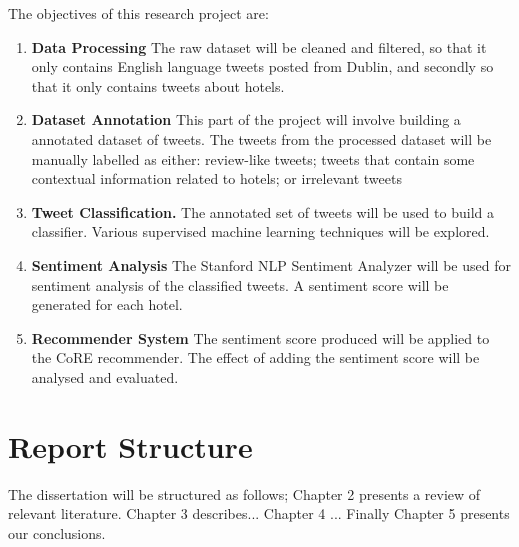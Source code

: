 The objectives of this research project are:
\begin{enumerate}
    \item \textbf{Data Processing}\newline
    The raw dataset will be cleaned and filtered, so that it only contains English language tweets posted from Dublin, and secondly so that it only contains tweets about hotels.
    \item \textbf{Dataset Annotation} \newline
    This part of the project will involve building a
    annotated dataset of tweets. The tweets from the processed dataset will be manually labelled as either: review-like tweets; tweets that contain some contextual information related to hotels; or irrelevant tweets
    \item \textbf{Tweet Classification.}\newline
    The annotated set of tweets will be used to build a classifier. Various supervised machine learning techniques will be explored.
    \item \textbf{Sentiment Analysis}\newline
    The Stanford NLP Sentiment Analyzer \cite{stanfordSentiment2013} will be used for sentiment analysis of the classified tweets. A sentiment score will be generated for each hotel.
    \item \textbf{Recommender System}\newline
    The sentiment score produced will be applied to the CoRE recommender.
    The effect of adding the sentiment score will be analysed and evaluated.
\end{enumerate}

\section{Report Structure}
The dissertation will be structured as follows; 
Chapter 2 presents a review of relevant literature. 
Chapter 3 describes... 
Chapter 4 ... 
Finally Chapter 5 presents our conclusions.
